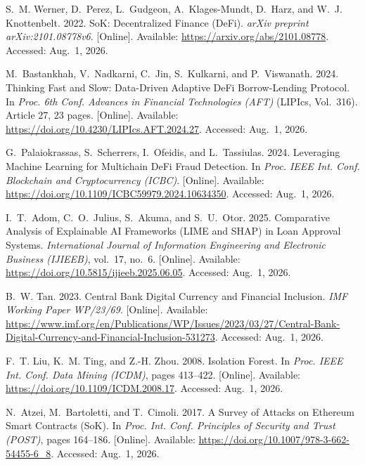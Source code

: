 \documentclass[12pt,a4paper]{report}
\begin{document}
{\small
\begin{enumerate}[label={[\arabic*]}]
\item S.~M. Werner, D.~Perez, L.~Gudgeon, A.~Klages-Mundt, D.~Harz, and W.~J. Knottenbelt. 2022. SoK: Decentralized Finance (DeFi). \emph{arXiv preprint arXiv:2101.08778v6}. [Online]. Available: \url{https://arxiv.org/abs/2101.08778}. Accessed: Aug.~1, 2026.

\item M.~Bastankhah, V.~Nadkarni, C.~Jin, S.~Kulkarni, and P.~Viswanath. 2024. Thinking Fast and Slow: Data-Driven Adaptive DeFi Borrow-Lending Protocol. In \emph{Proc. 6th Conf. Advances in Financial Technologies (AFT)} (LIPIcs, Vol.~316). Article 27, 23 pages. [Online]. Available: \url{https://doi.org/10.4230/LIPIcs.AFT.2024.27}. Accessed: Aug.~1, 2026.

\item G.~Palaiokrassas, S.~Scherrers, I.~Ofeidis, and L.~Tassiulas. 2024. Leveraging Machine Learning for Multichain DeFi Fraud Detection. In \emph{Proc. IEEE Int. Conf. Blockchain and Cryptocurrency (ICBC)}. [Online]. Available: \url{https://doi.org/10.1109/ICBC59979.2024.10634350}. Accessed: Aug.~1, 2026.

\item I.~T.~Adom, C.~O.~Julius, S.~Akuma, and S.~U.~Otor. 2025. Comparative Analysis of Explainable AI Frameworks (LIME and SHAP) in Loan Approval Systems. \emph{International Journal of Information Engineering and Electronic Business (IJIEEB)}, vol.~17, no.~6. [Online]. Available: \url{https://doi.org/10.5815/ijieeb.2025.06.05}. Accessed: Aug.~1, 2026.

\item B.~W. Tan. 2023. Central Bank Digital Currency and Financial Inclusion. \emph{IMF Working Paper WP/23/69}. [Online]. Available: \url{https://www.imf.org/en/Publications/WP/Issues/2023/03/27/Central-Bank-Digital-Currency-and-Financial-Inclusion-531273}. Accessed: Aug.~1, 2026.

\item F.~T. Liu, K.~M. Ting, and Z.-H. Zhou. 2008. Isolation Forest. In \emph{Proc. IEEE Int. Conf. Data Mining (ICDM)}, pages 413--422. [Online]. Available: \url{https://doi.org/10.1109/ICDM.2008.17}. Accessed: Aug.~1, 2026.

\item N.~Atzei, M.~Bartoletti, and T.~Cimoli. 2017. A Survey of Attacks on Ethereum Smart Contracts (SoK). In \emph{Proc. Int. Conf. Principles of Security and Trust (POST)}, pages 164--186. [Online]. Available: \url{https://doi.org/10.1007/978-3-662-54455-6_8}. Accessed: Aug.~1, 2026.


\end{enumerate}}
\end{document}
